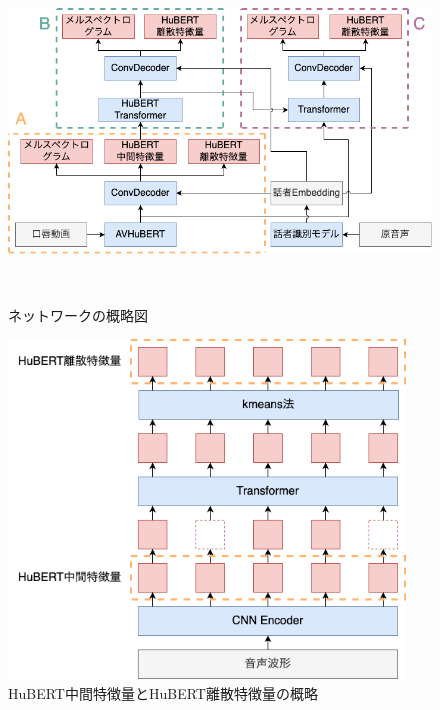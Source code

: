 \documentclass[12pt]{jarticle}
\numberwithin{equation}{section}    %
\numberwithin{figure}{section}      %
\numberwithin{table}{section}      %
\begin{document}
\begin{figure}[bt]
    \centering
    \includegraphics[height=90mm]{./figure/sec4/model/network.png}
    \caption{ネットワークの概略図}
    \label{sec4:fig:network}
\end{figure}

\begin{figure}[bt]
    \centering
    \includegraphics[height=90mm]{./figure/sec4/model/hubert.png}
    \caption{HuBERT中間特徴量とHuBERT離散特徴量の概略}
    \label{sec4:fig:hubert}
\end{figure}
\end{document}
